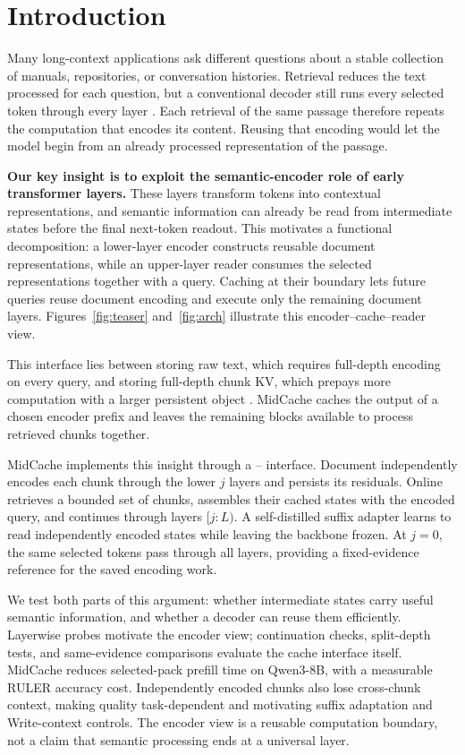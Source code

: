 \section{Introduction}
\label{sec:intro}
Many long-context applications ask different questions about a stable collection of manuals, repositories, or conversation histories. Retrieval reduces the text processed for each question, but a conventional decoder still runs every selected token through every layer \citep{rag,retrievallong}. Each retrieval of the same passage therefore repeats the computation that encodes its content. Reusing that encoding would let the model begin from an already processed representation of the passage.

\textbf{Our key insight is to exploit the semantic-encoder role of early transformer layers.} These layers transform tokens into contextual representations, and semantic information can already be read from intermediate states before the final next-token readout. This motivates a functional decomposition: a lower-layer encoder constructs reusable document representations, while an upper-layer reader consumes the selected representations together with a query. Caching at their boundary lets future queries reuse document encoding and execute only the remaining document layers. Figures~\ref{fig:teaser} and~\ref{fig:arch} illustrate this encoder--cache--reader view.

This interface lies between storing raw text, which requires full-depth encoding on every query, and storing full-depth chunk KV, which prepays more computation with a larger persistent object \citep{promptcache,cacheblend,turborag}. MidCache caches the output of a chosen encoder prefix and leaves the remaining blocks available to process retrieved chunks together.

MidCache implements this insight through a \writepass{}--\readpass{} interface. Document \writepass{} independently encodes each chunk through the lower $j$ layers and persists its residuals. Online \readpass{} retrieves a bounded set of chunks, assembles their cached states with the encoded query, and continues through layers $[j{:}L)$. A self-distilled suffix adapter learns to read independently encoded states while leaving the backbone frozen. At $j=0$, the same selected tokens pass through all layers, providing a fixed-evidence reference for the saved encoding work.



We test both parts of this argument: whether intermediate states carry useful semantic information, and whether a decoder can reuse them efficiently. Layerwise probes motivate the encoder view; continuation checks, split-depth tests, and same-evidence comparisons evaluate the cache interface itself. MidCache reduces selected-pack prefill time on Qwen3-8B, with a measurable RULER accuracy cost. Independently encoded chunks also lose cross-chunk context, making quality task-dependent and motivating suffix adaptation and Write-context controls. The encoder view is a reusable computation boundary, not a claim that semantic processing ends at a universal layer.

